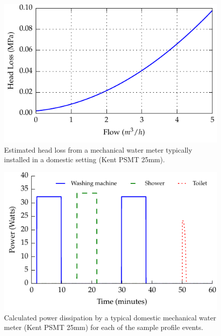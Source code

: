 \documentclass[10pt,final,journal]{IEEEtran}
\begin{document}
    \begin{figure}
        \begin{center}
        \includegraphics[width=\linewidth]{graph_pressureLoss.pdf}
        \end{center}
        \caption{Estimated head loss from a mechanical water meter typically installed in a domestic setting (Kent PSMT 25mm).}
        \label{fig:headloss}
    \end{figure}

    \begin{figure}
        \begin{center}
        \includegraphics[width=\linewidth]{graph_harvest.pdf}
        \end{center}
        \caption{Calculated power dissipation by a typical domestic mechanical water meter (Kent PSMT 25mm) for each of the sample profile events.}
        \label{fig:powerDissipated_meter}
    \end{figure}
\end{document}
